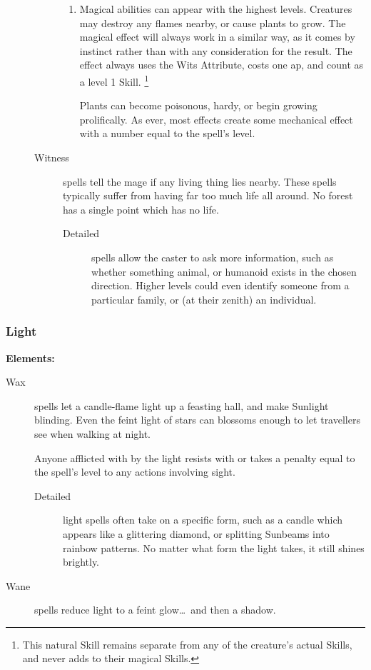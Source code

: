 \begin{multicols}{2}
\begin{description}
\begin{description}
\begin{enumerate}
          \item
            Magical abilities can appear with the highest levels.
            Creatures may destroy any flames nearby, or cause plants to grow.
            The magical effect will always work in a similar way, as it comes by instinct rather than with any consideration for the result.
            The effect always uses the Wits Attribute, costs one \gls{ap}, and count as a level 1 Skill.%
            \footnote{This natural Skill remains separate from any of the creature's actual Skills, and never adds to their magical Skills.}
      \item[Plants]
        can become poisonous, hardy, or begin growing prolifically.
        As ever, most effects create some mechanical effect with a number equal to the spell's level.
        \end{enumerate}
  \item[Witness]
    spells tell the mage if any living thing lies nearby.
    These spells typically suffer from having far too much life all around.
    No forest has a single point which has no life.
    \begin{description}
      \item[Detailed]
        spells allow the caster to ask more information, such as whether something animal, or humanoid exists in the chosen direction.
        Higher levels could even identify someone from a particular family, or (at their zenith) an individual.
    \end{description}
    \end{description}
\end{description}

\subsubsection{Light}

\textbf{Elements:}

\begin{description}
  \item[Wax]
    spells let a candle-flame light up a feasting hall, and make Sunlight blinding.
    Even the feint light of stars can blossoms enough to let travellers see when walking at night.

    Anyone afflicted with by the light resists with  or takes a penalty equal to the spell's level to any actions involving sight.
    \begin{description}
      \item[Detailed]
        light spells often take on a specific form, such as a candle which appears like a glittering diamond, or splitting Sunbeams into rainbow patterns.
        No matter what form the light takes, it still shines brightly.
    \end{description}
  \item[Wane]
    spells reduce light to a feint glow\ldots~and then a shadow.


\end{description}
\end{multicols}
